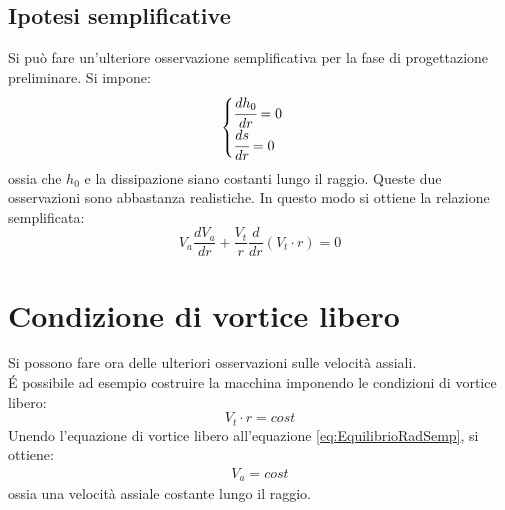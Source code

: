 \subsection{Ipotesi semplificative}
Si può fare un'ulteriore osservazione semplificativa per la fase di progettazione preliminare. Si impone:
\begin{align*}
\begin{cases}
\cfrac{dh_0}{dr} = 0\\
\cfrac{ds}{dr} = 0 
\end{cases}
\end{align*}
ossia che $h_0$ e la dissipazione siano costanti lungo il raggio. Queste due osservazioni sono abbastanza realistiche. In questo modo si ottiene la relazione semplificata:
\begin{equation}
\boxed{ V_a \frac{d V_a}{dr} + \frac{V_t}{r} \frac{d}{dr}(V_t \cdot r) = 0}
\label{eq:EquilibrioRadSemp}
\end{equation}
\section{Condizione di vortice libero}
Si possono fare ora delle ulteriori osservazioni sulle velocità assiali.\\
\'E possibile ad esempio costruire la macchina imponendo le condizioni di vortice libero:
\begin{equation}
\boxed{V_t \cdot r = cost}
\end{equation}
Unendo l'equazione di vortice libero all'equazione \ref{eq:EquilibrioRadSemp}, si ottiene:
\begin{align*}
V_a=cost
\end{align*}
ossia una velocità assiale costante lungo il raggio.

